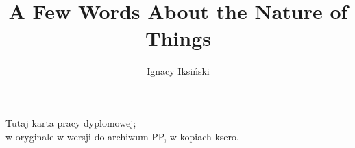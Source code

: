 \documentclass[en]{ppfcmthesis}
\author{Ignacy Iksiński}
\title{A Few Words About the Nature of Things}
\begin{document}
\maketitle\cleardoublepage%
\thispagestyle{empty}\vspace*{\fill}\noindent\begin{center}%
Tutaj karta pracy dyplomowej;\\w oryginale w wersji do archiwum PP, w kopiach ksero.\end{center}\vfill\cleardoublepage%
\frontmatter{}\cleardoublepage%


\mainmatter%




%
{\small}

\backmatter%

\end{document}
